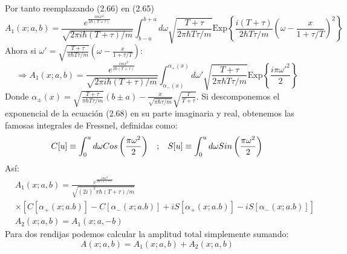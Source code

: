 Por tanto reemplazando (2.66) en (2.65)
\begin{equation}
A_{1}(x;a,b)=\frac{e^{\frac{imx^{2}}{2\hbar(T+\tau)}}}{\sqrt{2\pi i\hbar(T+\tau)/m}}\int_{b-a}^{b+a}d\omega\sqrt{\frac{T+\tau}{2\pi\hbar T\tau/m}}\text{Exp}\left\{ \frac{i(T+\tau)}{2\hbar T\tau/m}\left(\omega-\frac{x}{1+\tau/T}\right)^{2}\right\}
\end{equation}
Ahora si $\omega\prime=\sqrt{\frac{T+\tau}{\pi\hbar T\tau/m}}\left(\omega-\frac{x}{1+\tau/T}\right)$:
\begin{equation}
\Rightarrow A_{1}(x;a,b)=\frac{e^{\frac{imx^{2}}{2\hbar(T+\tau)}}}{\sqrt{2\pi i\hbar(T+\tau)/m}}\int_{\alpha_{-}(x)}^{\alpha_{+}(x)}d\omega\prime\sqrt{\frac{T+\tau}{2\pi\hbar T\tau/m}}\text{Exp}\left\{ \frac{i\pi\omega\prime^{2}}{2}\right\} 
\end{equation}
Donde $\alpha_{\pm}(x)=\sqrt{\frac{T+\tau}{\pi\hbar T\tau/m}}(b\pm a)-\frac{x}{\sqrt{\pi\hbar\tau/m}}\sqrt{\frac{T}{T+\tau}}$.
Si descomponemos el exponencial de la ecuación (2.68) en su parte imaginaria y real, obtenemos las famosas integrales de Fressnel, definidas como:
\begin{equation}
C[u]\equiv \int_{0}^{u}d\omega Cos\left(\frac{\pi\omega ^2 }{2}\right)\hspace{0.3cm} ;\hspace{0.3cm} S[u]\equiv \int_{0}^{u}d\omega Sin\left(\frac{\pi\omega ^2 }{2}\right)
\end{equation}
Así:
\begin{eqnarray}
&\nonumber A_{1}(x;a,b)=\frac{e^{\frac{imx^{2}}{2\hbar(T+\tau)}}}{\sqrt{(2i)^{2}\pi\hbar(T+\tau)/m}}\\
&\times[C[\alpha_{+}(x;a.b)]-C[\alpha_{-}(x;a.b)]+iS[\alpha_{+}(x;a.b)]-iS[\alpha_{-}(x;a.b)]]\\
&A_{2}(x;a,b)=A_{1}(x;a,-b)
\end{eqnarray}
Para dos rendijas podemos calcular la amplitud total simplemente sumando:
\begin{equation}
A(x;a,b)=A_{1}(x;a,b)+A_{2}(x;a,b)
\end{equation}


